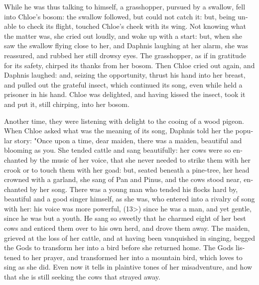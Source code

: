 \documentclass{book}
\begin{document}
\begin{pairs}
\begin{Rightside}
\begin{english}
  While he was thus talking to himself, a grasshopper, pursued by a swallow, fell into Chloe's bosom: the swallow followed, but could not catch it: but, being unable to check its flight, touched Chloe's cheek with its wing.  Not knowing what the matter was, she cried out loudly, and woke up with a start: but, when she saw the swallow flying close to her, and Daphnis laughing at her alarm, she was reassured, and rubbed her still drowsy eyes.  The grasshopper, as if in gratitude for its safety, chirped its thanks from her bosom.  Then Chloe cried out again, and Daphnis laughed: and, seizing the opportunity, thrust his hand into her breast, and pulled out the grateful insect, which continued its song, even while held a prisoner in his hand.  Chloe was delighted, and having kissed the insect, took it and put it, still chirping, into her bosom.
\pend


  Another time, they were listening with delight to the cooing of a wood pigeon.  When Chloe asked what was the meaning of its song, Daphnis told her the popular story: "Once upon a time, dear maiden, there was a maiden, beautiful and blooming as you.  She tended cattle and sang beautifully: her cows were so enchanted by the music of her voice, that she never needed to strike them with her crook or to touch them with her goad: but, seated beneath a pine-tree, her head crowned with a garland, she sang of Pan and Pinus, and the cows stood near, enchanted by her song.  There was a young man who tended his flocks hard by, beautiful and a good singer himself, as she was, who entered into a rivalry of song with her: his voice was more powerful, (13>) since he was a man, and yet gentle, since he was but a youth.  He sang so sweetly that he charmed eight of her best cows and enticed them over to his own herd, and drove them away.  The maiden, grieved at the loss of her cattle, and at having been vanquished in singing, begged the Gods to transform her into a bird before she returned home.  The Gods listened to her prayer, and transformed her into a mountain bird, which loves to sing as she did.  Even now it tells in plaintive tones of her misadventure, and how that she is still seeking the cows that strayed away.
\pend



\end{english}
\end{Rightside}
\end{pairs}
\end{document}
